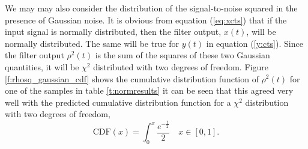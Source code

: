 We may may also consider the distribution of the signal-to-noise squared in
the presence of Gaussian noise. It is obvious from equation (\ref{eq:xcts})
that if the input signal is normally distributed, then the filter output,
$x(t)$, will be normally distributed. The same will be true for $y(t)$ in
equation (\ref{y:cts}). Since the filter output $\rho^2(t)$ is the sum of the
squares of these two Gaussian quantities, it will be $\chi^2$ distributed with
two degrees of freedom. Figure \ref{f:rhosq_gaussian_cdf} shows the cumulative
distribution function of $\rho^2(t)$ for one of the samples in table
\ref{t:normresults} it can be seen that this agreed very well with the
predicted cumulative distribution function for a $\chi^2$ distribution with
two degrees of freedom,
\begin{equation}
\mathrm{CDF}(x) = \int_0^x \frac{e^{-\frac{t}{2}}}{2} \quad x \in [0,1].
\end{equation}
